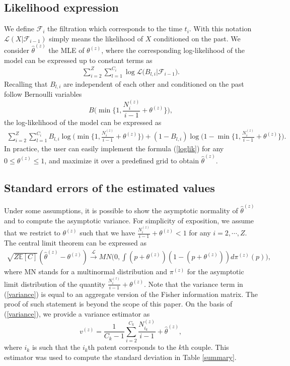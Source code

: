 \documentclass[article]{article}%
\begin{document}
\subsection{Likelihood expression}
We define $\mathcal{F}_i$ the filtration which corresponds to the time $t_i$. With this notation $\mathcal{L}( X | \mathcal{F}_{i-1})$ simply means the likelihood of $X$ conditioned on the past. We consider $\widehat{\theta}^{(z)}$ the MLE of $\theta^{(z)}$, where the corresponding log-likelihood of the model can be expressed up to constant terms as
\begin{eqnarray*}
\sum_{i=2}^Z \sum_{l=1}^{C_i} \log \mathcal{L} \big( B_{l,i} | \mathcal{F}_{i-1} \big).
\end{eqnarray*}
Recalling that $B_{l,i}$ are independent of each other and conditioned on the past follow Bernoulli variables 
$$B \Big( \min \Big\{ 1, \frac{N_{i}^{(z)}}{i-1} + \theta^{(z)} \Big\} \Big),$$ 
the log-likelihood of the model can be expressed as 
\begin{eqnarray}
\label{loglik}
\sum_{i=2}^Z \sum_{l=1}^{C_i} B_{l,i} \log \Big( \min \Big\{ 1, \frac{N_{i}^{(z)}}{i-1} + \theta^{(z)} \Big\} \Big) +(1 - B_{l,i}) \log \Big(1 - \min \Big\{ 1, \frac{N_{i}^{(z)}}{i-1} + \theta^{(z)} \Big\} \Big).
\end{eqnarray}
In practice, the user can easily implement the formula (\ref{loglik}) for any $0 \leq \theta^{(z)} \leq 1$, and maximize it over a predefined grid to obtain $\widehat{\theta}^{(z)}$.

\subsection{Standard errors of the estimated values}
Under some assumptions, it is possible to show the asymptotic normality of $\widehat{\theta}^{(z)}$ and to compute the asymptotic variance. For simplicity of exposition, we assume that we restrict to $\theta^{(z)}$ such that we have $\frac{N_{i}^{(z)}}{i-1} + \theta^{(z)} < 1$ for any $i=2, \cdots, Z$. The central limit theorem can be expressed as 
\begin{eqnarray}
\label{variance}
\sqrt{Z \mathbb{E} [ C ]} (\widehat{\theta}^{(z)} - \theta^{(z)}) \overset{\mathcal{L}}{\rightarrow} MN \Big( 0, \int (p + \theta^{(z)})(1 - (p + \theta^{(z)})) d\pi^{(z)} (p) \Big),
\end{eqnarray}
where MN stands for a multinormal distribution and $\pi^{(z)}$ for the asymptotic limit distribution of the quantity $\frac{N_{i}^{(z)}}{i-1} + \theta^{(z)}$. Note that the variance term in (\ref{variance}) is equal to an aggregate version of the Fisher information matrix. The proof of such statement is beyond the scope of this paper. On the basis of (\ref{variance}), we provide a variance estimator as 
$$v^{(z)} = \frac{1}{C_k-1}\sum_{i=2}^{C_k}  \frac{N_{i_k}^{(z)}}{i-1} + \widehat{\theta}^{(z)},$$ 
where $i_k$ is such that the $i_k$th patent corresponds to the $k$th couple. This estimator was used to compute the standard deviation in Table \ref{summary}.
\end{document}
